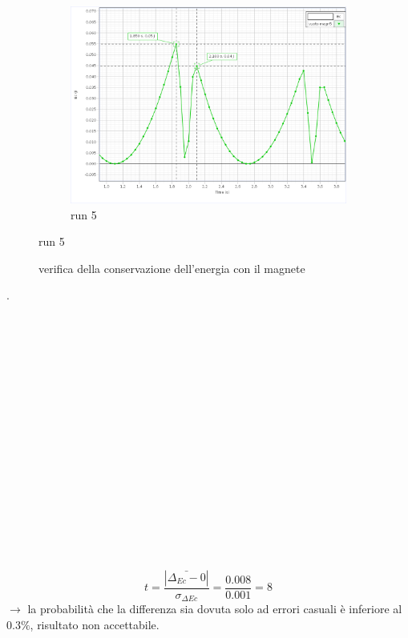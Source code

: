 \documentclass[a4paper]{article}
\theoremstyle{definition}
\begin{document}
\begin{figure}[!htbp]
{{			\begin{subfigure}{2.2\textwidth}
				\caption{run 5}
				\includegraphics[scale=1.15]{capstone_data/Ec_magn_5.png}
			\end{subfigure}%
			
		}
	}
\end{figure}

\begin{figure}[!htbp]
	\captionsetup{labelformat= empty}
	\caption{verifica della conservazione dell'energia con il magnete}
\end{figure}
.\\\\\\\\\\\\\\\\\\\\\\\\\\\\\\\\\\\\
\[t = \frac{ \left |\bar{\Delta_{Ec} - 0} \right |}{\sigma_{\Delta Ec}} = \frac{0.008}{0.001} = 8\]
\noindent \(\rightarrow\) la probabilità che la differenza sia dovuta solo ad errori casuali è inferiore al 0.3\(\%\), risultato non accettabile.\\\\
\end{document}

